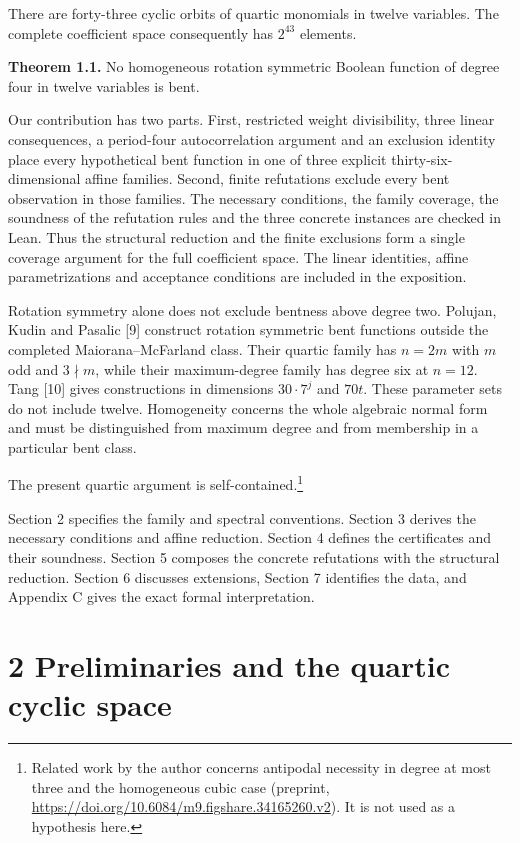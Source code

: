 \documentclass[11pt,a4paper]{article}
\begin{document}
There are forty-three cyclic orbits of quartic monomials in twelve variables. The complete coefficient space consequently has $2^{43}$ elements.

\textbf{Theorem 1.1.} No homogeneous rotation symmetric Boolean function of degree four in twelve variables is bent.

Our contribution has two parts. First, restricted weight divisibility, three linear consequences, a period-four autocorrelation argument and an exclusion identity place every hypothetical bent function in one of three explicit thirty-six-dimensional affine families. Second, finite refutations exclude every bent observation in those families. The necessary conditions, the family coverage, the soundness of the refutation rules and the three concrete instances are checked in Lean. Thus the structural reduction and the finite exclusions form a single coverage argument for the full coefficient space. The linear identities, affine parametrizations and acceptance conditions are included in the exposition.

Rotation symmetry alone does not exclude bentness above degree two. Polujan, Kudin and Pasalic [9] construct rotation symmetric bent functions outside the completed Maiorana--McFarland class. Their quartic family has $n=2m$ with $m$ odd and $3\nmid m$, while their maximum-degree family has degree six at $n=12$. Tang [10] gives constructions in dimensions $30\cdot7^j$ and $70t$. These parameter sets do not include twelve. Homogeneity concerns the whole algebraic normal form and must be distinguished from maximum degree and from membership in a particular bent class.

The present quartic argument is self-contained.\footnote{Related work by the author concerns antipodal necessity in degree at most three and the homogeneous cubic case (preprint, \url{https://doi.org/10.6084/m9.figshare.34165260.v2}). It is not used as a hypothesis here.}


Section 2 specifies the family and spectral conventions. Section 3 derives the necessary conditions and affine reduction. Section 4 defines the certificates and their soundness. Section 5 composes the concrete refutations with the structural reduction. Section 6 discusses extensions, Section 7 identifies the data, and Appendix C gives the exact formal interpretation.

\section*{2 Preliminaries and the quartic cyclic space}
\end{document}
